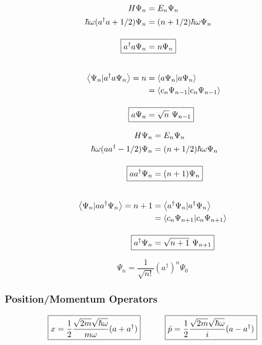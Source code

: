 \documentclass[12pt]{article}
\begin{document}
\noindent 
\begin{minipage}{0.48\textwidth}
    \begin{align*}
        \hspace{1.0cm} H \Psi_n &= E_n \Psi_n \\
        \hbar \omega (a^\dagger a + 1/2) \Psi_n &= (n+1/2) \hbar \omega \Psi_n\\[10pt]
        \Aboxed{ a^\dagger a \Psi_n &= n \Psi_n }\\[20pt]
        \left< \Psi_n | a^\dagger a \Psi_n \right> ={} n
        &= \left< a \Psi_n | a \Psi_n \right>\\
        &= \left< c_n \Psi_{n-1} | c_n \Psi_{n-1} \right>\\[10pt]
        \Aboxed{ a \Psi_n &= \sqrt{n} \ \Psi_{n-1} }
    \end{align*}
\end{minipage}
\begin{minipage}{0.48\textwidth}
    \begin{align*}
        \hspace{1.0cm} H \Psi_n &= E_n \Psi_n \\
        \hbar \omega (a a^\dagger - 1/2) \Psi_n &= (n+1/2) \hbar \omega \Psi_n\\[10pt]
        \Aboxed{ a a^\dagger \Psi_n &= (n+1) \Psi_n }\\[20pt]
        \left< \Psi_n | a a^\dagger \Psi_n \right> ={} n+1
        &= \left< a^\dagger \Psi_n | a^\dagger \Psi_n \right>\\
        &= \left< c_n \Psi_{n+1} | c_n \Psi_{n+1} \right>\\[10pt]
        \Aboxed{ a^\dagger \Psi_n &= \sqrt{n+1} \ \Psi_{n+1} }
    \end{align*}
\end{minipage}

\vspace{15pt}
\[ \boxed{ \Psi_n = \frac{1}{ \sqrt{n!} }(a^\dagger)^n \Psi_0 }\]

\vspace{10pt}
\subsubsection{Position/Momentum Operators}
\vspace{5pt}
\[ \boxed{ \displaystyle x = \frac{1}{2} 
        \frac{ \sqrt{2 m} \sqrt{\hbar \omega} }{m \omega} (a + a^\dagger) }
    \indent \indent 
    \boxed{ \hat{p} = \frac{1}{2} 
        \frac{ \sqrt{2 m} \sqrt{\hbar \omega} }{i} (a - a^\dagger) } \]
\end{document}
